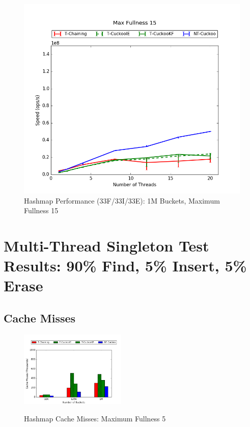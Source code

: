 \begin{figure}[H]
    \centering
	\begin{minipage}{0.5\textwidth}\includegraphics[width=\textwidth]{maps/15HM1M:F34,I33,E33.png} 
    \end{minipage}
	\begin{minipage}{0.4\textwidth}
    
    \end{minipage}
    \caption{Hashmap Performance (33F/33I/33E): 1M Buckets, Maximum Fullness 15}
\end{figure}

\section{Multi-Thread Singleton Test Results: 90\% Find, 5\% Insert, 5\% Erase}

\subsection{Cache Misses}
\label{app:hm_cm_90}
    \begin{figure}[H]
    \centering
        {\includegraphics[width=0.45\textwidth]{maps/905cm.png}}
        \caption{Hashmap Cache Misses: Maximum Fullness 5}
    \end{figure}

